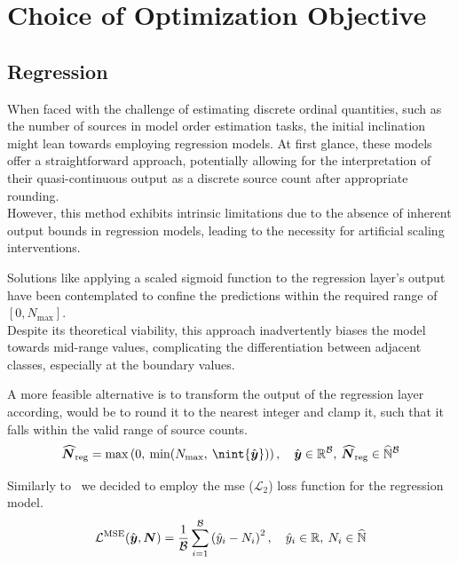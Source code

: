 \section{Choice of Optimization Objective}

\subsection{Regression}
When faced with the challenge of estimating discrete ordinal quantities, such as the number of sources in model order estimation tasks,
the initial inclination might lean towards employing regression models.
At first glance, these models offer a straightforward approach, potentially allowing for the interpretation of their
quasi-continuous output as a discrete source count after appropriate rounding.\\
However, this method exhibits intrinsic limitations due to the absence of inherent output bounds in regression models,
leading to the necessity for artificial scaling interventions.

Solutions like applying a scaled sigmoid function to the regression layer's output have been contemplated to confine the
predictions within the required range of \( [0, N_{\max}] \).\\
Despite its theoretical viability, this approach inadvertently biases the model towards mid-range values,
complicating the differentiation between adjacent classes, especially at the boundary values.

A more feasible alternative is to transform the output of the regression layer according, would be to round it to
the nearest integer and clamp it, such that it falls within the valid range of source counts.
\begin{equation}
    \bfm{\NPred}_{\text{reg}} = \max\left(0,\:\min(N_{\max},\:\nint{\hat{\bfm{y}}})\right), \quad \hat{\bfm{y}} \in \mathbb{R}^{\B}, \: \bfm{\NPred}_{\text{reg}} \in \NSet^{\B}
    \label{eq:regression_clamp}
\end{equation}

Similarly to~\cite{yang2020} we decided to employ the \gls{mse} (\( \mathcal{L}_2 \)) loss function for the regression model.
\begin{equation}
    \mathcal{L}^{\text{MSE}}(\hat{\boldsymbol{y}}, \boldsymbol{N}) = \frac{1}{\mathcal{B}} \sum_{i=1}^{\mathcal{B}} \left(\hat{y}_i - N_i\right)^2, \quad \hat{y}_i \in \mathbb{R},\: N_i \in \widehat{\mathbb{N}}
    \label{eq:mse_loss}
\end{equation}

